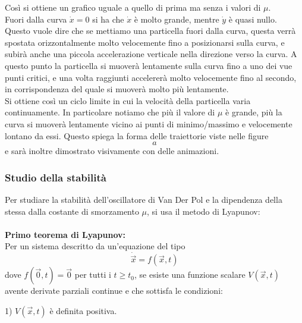 \documentclass[12pt]{article}
\newcommand{\vo}{\vec{0}}
\begin{document}
Così si ottiene un grafico uguale a quello di prima ma senza i valori di $\mu$. \\
Fuori dalla curva $\dot{x} = 0$ si ha che $\dot{x}$ è molto grande, mentre $\dot{y}$ è quasi nullo. Questo vuole dire che se mettiamo una particella fuori dalla curva, questa verrà spostata orizzontalmente molto velocemente fino a posizionarsi sulla curva, e subirà anche una piccola accelerazione verticale nella direzione verso la curva. A questo punto la particella si muoverà lentamente sulla curva fino a uno dei vue punti critici, e una volta raggiunti accelererà molto velocemente fino al secondo, in corrispondenza del quale si muoverà molto più lentamente. \\
Si ottiene così un ciclo limite in cui la velocità della particella varia continuamente. In particolare notiamo che più il valore di $\mu$ è grande, più la curva si muoverà lentamente vicino ai punti di minimo/massimo e velocemente lontano da essi. Questo spiega la forma delle traiettorie viste nelle figure $$ a $$ e sarà inoltre dimostrato visivamente con delle animazioni.
\subsubsection{Studio della stabilità }
Per studiare la stabilità dell'oscillatore di Van Der Pol e la dipendenza della stessa dalla costante di smorzamento $\mu$, si usa il metodo di Lyapunov: \\ \\
\textbf{Primo teorema di Lyapunov: \\}
Per un sistema descritto da un'equazione del tipo 
\begin{equation}
	\dot{\vec{x}} = f(\vec{x},t)
\end{equation}
dove $f(\vo,t) = \vo$ per tutti i $t \geq t_0$, se esiste una funzione scalare $V(\vec{x},t)$ avente derivate parziali continue e che sottisfa le condizioni: 

1) $V(\vec{x},t)$ è definita positiva. 
\end{document}
